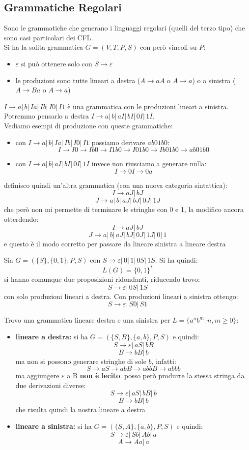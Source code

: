 \documentclass[a4paper,12pt, oneside]{book}
\begin{document}
\subsection{Grammatiche Regolari}
Sono le grammatiche che generano i linguaggi regolari (quelli del terzo tipo) che sono casi particolari dei CFL.\\
Si ha la solita grammatica $G = (V, T, P, S)$ con però vincoli su $P$:
\begin{itemize}
\item $\varepsilon$ si può ottenere solo con $S\to \varepsilon$
\item le produzioni sono tutte lineari a destra ($A\to aA$ o $A\to a$) o a sinistra ($A\to Ba$ o $A\to a$)
\end{itemize}
\begin{esempio}
$I\to a|\,b|\,Ia|\,Ib|\,I0|\,I1$ è una grammatica con le produzioni lineari a sinistra.\\
Potremmo pensarlo a destra $I\to a|\,b|\,aI|\,bI|\,0I|\,1I$.\\
Vediamo esempi di produzione con queste grammatiche:
\begin{itemize}
\item con $I\to a|\,b|\,Ia|\,Ib|\,I0|\,I1$ possiamo derivare $ab01b0$:
$$I\to I0\to Ib0\to I1b0\to I01b0\to Ib01b0\to ab01b0$$
\item con $I\to a|\,b|\,aI|\,bI|\,0I|\,1I$ invece non riusciamo a generare nulla:
$$I\to 0I\to 0a$$
\end{itemize}
definisco quindi un'altra grammatica (con una nuova categoria sintattica):
$$I\to aJ|\, bJ$$
$$J\to a|\,b|\,aJ|\,bJ|\,0J|\,1J$$
che però non mi permette di terminare le stringhe con 0 e 1, la modifico ancora otterdendo:
$$I\to aJ|\, bJ$$
$$J\to a|\,b|\,aJ|\,bJ|\,0J|\,1J|\,0|\,1$$
e questo è il modo corretto per passare da lineare sinistra a lineare destra
\end{esempio}
\begin{esempio}
Sia $G=(\{S\},\{0,1\},P,S)$ con $S\to \varepsilon|\,0|\,1|\,0S|\,1S$. Si ha quindi:
$$L(G)=\{0,1\}^*$$
si hanno comunque due proposizioni ridondanti, riducendo trovo:
$$S\to \varepsilon|\, 0S|\,1S$$
con solo produzioni lineari a destra. Con produzioni lineari a sinistra ottengo:
$$S\to \varepsilon|\, S0|\,S1$$
\end{esempio}
\begin{esempio}
Trovo una grammatica lineare destra e una sinistra per $L=\{a^nb^m|\,n,m\geq 0\}$:
\begin{itemize}
\item \textbf{lineare a destra:} si ha $G=(\{S,B\},\{a,b\},P,S)$ e quindi:
$$S\to \varepsilon|\,aS|\,bB$$
$$B\to bB|\,b$$
ma non si possono generare stringhe di sole $b$, infatti:
$$S\to aS\to abB\to abbB\to abbb$$
ma aggiungere $\varepsilon$ a B \textbf{non è lecito}. posso però produrre la stessa stringa da due derivazioni diverse:
$$S\to \varepsilon|\,aS|\,bB|\,b$$
$$B\to bB|\,b$$
che risulta quindi la nostra lineare a destra
\item \textbf{lineare a sinistra:} si ha $G=(\{S,A\},\{a,b\},P,S)$ e quindi:
$$S\to \varepsilon|\,Sb|\,Ab|\,a$$
$$A\to Aa|\,a$$
\end{itemize}
\end{esempio}
\end{document}
